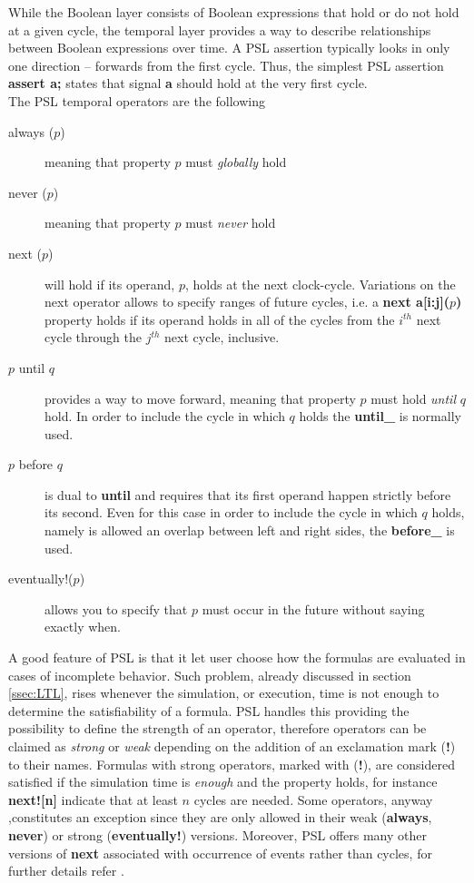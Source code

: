While the Boolean layer consists of Boolean expressions that hold or do not hold at a given cycle, the temporal layer provides a way to describe relationships between Boolean expressions over time. A PSL assertion typically looks in only one direction – forwards from the first cycle. Thus, the simplest PSL assertion \textbf{assert a;} states that signal \textbf{a} should hold at the very first cycle. 
\noindent
\\
The PSL temporal operators are the following
\begin{description}
\item[always ($p$)] meaning that property $p$ must \textit{globally} hold
\item[never ($p$)] meaning that property $p$ must \textit{never} hold
\item[next ($p$)] will hold if its operand, $p$, holds at the next clock-cycle. Variations on the next operator allows to specify ranges of future cycles, i.e. a  \textbf{next a[i:j]($p$)} property holds if its operand holds in all of the cycles from the $i^{th}$ next cycle through the $j^{th}$ next cycle, inclusive.
\item[$p$ until $q$] provides a way to move forward, meaning that property $p$ must hold \textit{until} $q$ hold. In order to include the cycle in which $q$ holds the \textbf{until\_} is normally used.
\item[$p$ before $q$] is dual to \textbf{until} and requires that its first operand happen strictly before
its second. Even for this case in order to include the cycle in which $q$ holds, namely is allowed an overlap between left and right sides, the \textbf{before\_} is used.
\item[eventually!($p$)] allows you to specify that $p$ must occur in the future without saying exactly when.
\end{description}
A good feature of PSL is that it let user choose how the formulas are evaluated in cases of incomplete behavior. Such problem, already discussed in section \ref{ssec:LTL}, rises whenever the simulation, or execution, time is not enough to determine the satisfiability of a formula. PSL handles this providing the possibility to define the strength of an operator, therefore operators can be claimed as \textit{strong}  or \textit{weak} depending on the addition of an exclamation mark (\textbf{!}) to their names. Formulas with strong operators, marked with (\textbf{!}), are considered satisfied if the simulation time is \textit{enough}  and the property holds, for instance \textbf{next![n]} indicate that at least $n$ cycles are needed. Some operators, anyway ,constitutes an exception since they are only allowed in their weak (\textbf{always}, \textbf{never}) or strong (\textbf{eventually!}) versions. Moreover, PSL offers many other versions of \textbf{next} associated with occurrence of events rather than cycles, for further details refer \citep{eisner2007practical}.

